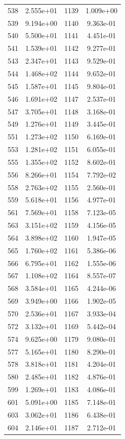 \documentclass[12pt]{article}
\begin{document}
\begin{longtable}{@{}cccc@{}}
538 & 2.555e+01 & 1139 & 1.009e+00 \\
539 & 9.194e+00 & 1140 & 9.363e-01 \\
540 & 5.500e+01 & 1141 & 4.451e-01 \\
541 & 1.539e+01 & 1142 & 9.277e-01 \\
543 & 2.347e+01 & 1143 & 9.529e-01 \\
544 & 1.468e+02 & 1144 & 9.652e-01 \\
545 & 1.587e+01 & 1145 & 9.804e-01 \\
546 & 1.691e+02 & 1147 & 2.537e-01 \\
547 & 3.705e+01 & 1148 & 3.168e-01 \\
549 & 1.276e+01 & 1149 & 3.445e-01 \\
551 & 1.273e+02 & 1150 & 6.169e-01 \\
553 & 1.281e+02 & 1151 & 6.055e-01 \\
555 & 1.355e+02 & 1152 & 8.602e-01 \\
556 & 8.266e+01 & 1154 & 7.792e-02 \\
558 & 2.763e+02 & 1155 & 2.560e-01 \\
559 & 5.618e+01 & 1156 & 4.977e-01 \\
561 & 7.569e+01 & 1158 & 7.123e-05 \\
563 & 3.151e+02 & 1159 & 4.156e-05 \\
564 & 3.898e+02 & 1160 & 1.947e-05 \\
565 & 1.760e+02 & 1161 & 5.386e-06 \\
566 & 6.795e+01 & 1162 & 1.555e-06 \\
567 & 1.108e+02 & 1164 & 8.557e-07 \\
568 & 3.584e+01 & 1165 & 4.244e-06 \\
569 & 3.949e+00 & 1166 & 1.902e-05 \\
570 & 2.536e+01 & 1167 & 3.933e-04 \\
572 & 3.132e+01 & 1169 & 5.442e-04 \\
574 & 9.625e+00 & 1179 & 9.080e-01 \\
577 & 5.165e+01 & 1180 & 8.290e-01 \\
578 & 3.818e+01 & 1181 & 4.204e-01 \\
580 & 2.485e+01 & 1182 & 4.876e-01 \\
599 & 1.269e+01 & 1183 & 4.086e-01 \\
601 & 5.091e+00 & 1185 & 7.148e-01 \\
603 & 3.062e+01 & 1186 & 6.438e-01 \\
604 & 2.146e+01 & 1187 & 2.712e-01 \\

\end{longtable}
\end{document}
